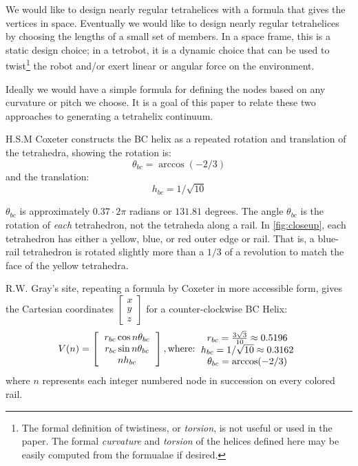 \documentclass[review]{siamonline1116}
\begin{document}
We would like to design nearly regular tetrahelices with a formula that
gives the vertices in space. Eventually we would like to design nearly regular
tetrahelices by choosing the lengths of a small set of members.
In a space frame, this is a static design choice; in a tetrobot, it is a
dynamic choice that can be used to twist\footnote{The formal definition of twistiness, or \emph{torsion},
is not useful or used in the paper. The formal \emph{curvature} and \emph{torsion} of the helices defined here
may be easily computed from the formualae if desired.} the robot and/or exert linear or
angular force on the environment.

Ideally we would have a simple formula for defining the nodes based on
any curvature or pitch we choose. It is a goal of
this paper to relate these two approaches to generating a tetrahelix
continuum.


H.S.M Coxeter constructs the BC helix\cite{coxeter1985simplicial} as a repeated rotation and translation of the tetrahedra, showing the
rotation is:
\[
\theta_{bc} = \arccos(-2/3) 
\]
and the translation:
\[
h_{bc} = 1/\sqrt{10}
\]

$\theta_{bc}$ is approximately $0.37 \cdot 2 \pi$ radians or  $131.81$ degrees.
The angle $\theta_{bc}$ is the rotation of \emph{each} tetrahedron, not the tetraheda along a rail.  In \cref{fig:closeup},
each tetrahedron has either a yellow, blue, or red outer edge or rail.
That is, a blue-rail tetrahedron is rotated slightly more than a $1/3$ of a revolution to match the face of the yellow tetrahedra.

R.W. Gray's site\cite{graytetrahelix}, repeating a formula by Coxeter\cite{coxeter1985simplicial} in more accessible form, gives the Cartesian coordinates $\begin{bmatrix}
           x \\
           y \\
           z
         \end{bmatrix}$
for a counter-clockwise BC Helix:
\begin{equation}
  \label{graycoxeter}
V(n) =
\left [
  \begin{tabular}{c}
   $ r_{bc} \cos{n \theta_{bc}} $\\
   $ r_{bc} \sin{n \theta_{bc}} $\\
   $ n h_{bc}  $
  \end{tabular}
  \right ],
\text{where:}
  \begin{tabular}{c}
 $ r_{bc} = \frac{3\sqrt{3}}{10} \approx 0.5196 $\\
 $ h_{bc} = 1/\sqrt{10} \approx 0.3162 $ \\
 $ \theta_{bc} = \arccos(-2/3) $ \\
  \end{tabular}      
\end{equation}
where $n$ represents each integer numbered node in succession on every colored rail.
\end{document}
